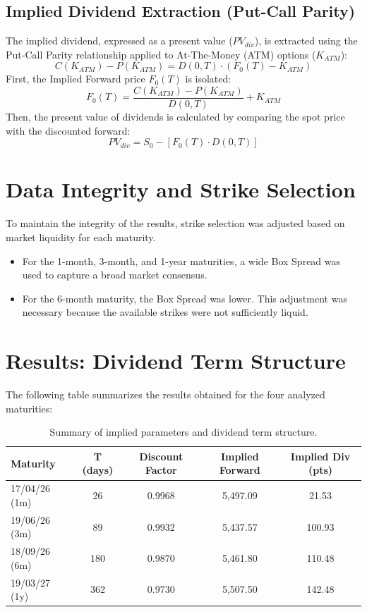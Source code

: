 \documentclass{report}
\begin{document}
\subsection{Implied Dividend Extraction (Put-Call Parity)}
The implied dividend, expressed as a present value ($PV_{div}$), is extracted using the Put-Call Parity relationship applied to At-The-Money (ATM) options ($K_{ATM}$):
\begin{equation}
C(K_{ATM}) - P(K_{ATM}) = D(0,T) \cdot (F_0(T) - K_{ATM})
\end{equation}
First, the Implied Forward price $F_0(T)$ is isolated:
\begin{equation}
F_0(T) = \frac{C(K_{ATM}) - P(K_{ATM})}{D(0,T)} + K_{ATM}
\end{equation}
Then, the present value of dividends is calculated by comparing the spot price with the discounted forward:
\begin{equation}
PV_{div} = S_0 - [F_0(T) \cdot D(0,T)]
\end{equation}

\section{Data Integrity and Strike Selection}
To maintain the integrity of the results, strike selection was adjusted based on market liquidity for each maturity. 
\begin{itemize}
    \item For the 1-month, 3-month, and 1-year maturities, a wide Box Spread was used to capture a broad market consensus.
    \item For the 6-month maturity, the Box Spread was lower. This adjustment was necessary because the available strikes were not sufficiently liquid.
\end{itemize}

\section{Results: Dividend Term Structure}
The following table summarizes the results obtained for the four analyzed maturities:

\begin{table}[h]
\centering
\begin{tabular}{lcccc}
\toprule
\textbf{Maturity} & \textbf{T (days)} & \textbf{Discount Factor} & \textbf{Implied Forward} & \textbf{Implied Div (pts)} \\
\midrule
17/04/26 (1m) & 26  & 0.9968 & 5,497.09 & 21.53 \\
19/06/26 (3m) & 89  & 0.9932 & 5,437.57 & 100.93 \\
18/09/26 (6m) & 180 & 0.9870 & 5,461.80 & 110.48 \\
19/03/27 (1y) & 362 & 0.9730 & 5,507.50 & 142.48 \\
\bottomrule
\end{tabular}
\caption{Summary of implied parameters and dividend term structure.}
\end{table}
\end{document}
